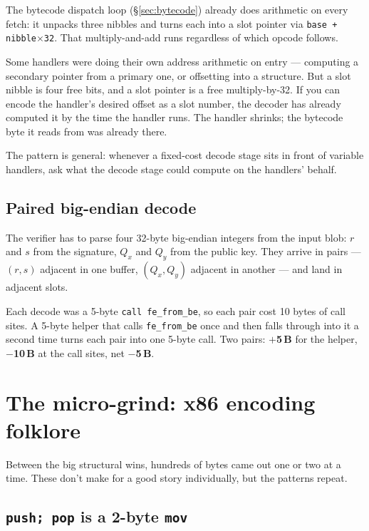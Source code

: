 \documentclass[11pt,a4paper]{article}
\newcommand{\saved}[1]{\textcolor{green!50!black}{\textbf{$-$#1\,B}}}
\newcommand{\spent}[1]{\textcolor{red!70!black}{\textbf{$+$#1\,B}}}
\begin{document}
The bytecode dispatch loop (\S\ref{sec:bytecode}) already does
arithmetic on every fetch: it unpacks three nibbles and turns each
into a slot pointer via \texttt{base + nibble$\times$32}. That
multiply-and-add runs regardless of which opcode follows.

Some handlers were doing their own address arithmetic on entry ---
computing a secondary pointer from a primary one, or offsetting into
a structure. But a slot nibble is four free bits, and a slot pointer
is a free multiply-by-32. If you can encode the handler's desired
offset as a slot number, the decoder has already computed it by the
time the handler runs. The handler shrinks; the bytecode byte it
reads from was already there.

The pattern is general: whenever a fixed-cost decode stage sits in
front of variable handlers, ask what the decode stage could compute
on the handlers' behalf.

\subsection{Paired big-endian decode}

The verifier has to parse four 32-byte big-endian integers from the
input blob: $r$ and $s$ from the signature, $Q_x$ and $Q_y$ from the
public key. They arrive in pairs --- $(r,s)$ adjacent in one buffer,
$(Q_x,Q_y)$ adjacent in another --- and land in adjacent slots.

Each decode was a 5-byte \texttt{call fe\_from\_be}, so each pair
cost 10 bytes of call sites. A 5-byte helper that calls
\texttt{fe\_from\_be} once and then falls through into it a second
time turns each pair into one 5-byte call. Two pairs: \spent{5} for
the helper, \saved{10} at the call sites, net \saved{5}.

\section{The micro-grind: x86 encoding folklore}
\label{sec:grind}

Between the big structural wins, hundreds of bytes came out one or
two at a time. These don't make for a good story individually, but
the patterns repeat.

\subsection{\texttt{push;\,pop} is a 2-byte \texttt{mov}}
\end{document}

